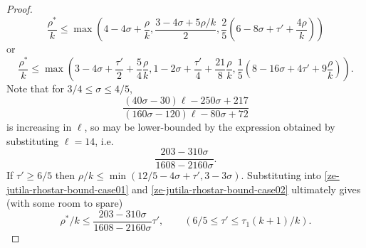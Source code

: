 \begin{proof}
\begin{equation}
\frac{\rho^*}{k} \le \max(4 - 4\sigma + \frac{\rho}{k}, \frac{3 - 4\sigma + 5\rho/k}{2}, \frac{2}{5}(6 - 8\sigma + \tau' + \frac{4\rho}{k}))
\end{equation}
or 
\begin{equation}\label{ze-jutila-rhostar-bound-case02}
\frac{\rho^*}{k} \le \max(3 - 4\sigma + \frac{\tau'}{2} + \frac{5}{4}\frac{\rho}{k}, 1 - 2\sigma + \frac{\tau'}{4} + \frac{21}{8}\frac{\rho}{k}, \frac{1}{5}(8 - 16\sigma + 4\tau' + 9\frac{\rho}{k})).
\end{equation}
Note that for $3/4 \le \sigma \le 4/5$,
\[
\frac{(40\sigma - 30)\ell - 250\sigma + 217}{(160\sigma - 120)\ell - 80\sigma + 72}
\]
is increasing in $\ell$, so may be lower-bounded by the expression obtained by substituting $\ell = 14$, i.e.
\[
\frac{203 - 310\sigma}{1608 - 2160\sigma}.
\]
If $\tau' \ge 6/5$ then $\rho/k \le \min(12/5 - 4\sigma + \tau', 3 - 3\sigma)$. Substituting into \eqref{ze-jutila-rhostar-bound-case01} and \eqref{ze-jutila-rhostar-bound-case02} ultimately gives (with some room to spare)
\[
\rho^*/k \le \frac{203 - 310\sigma}{1608 - 2160\sigma}\tau',\qquad (6/5 \le \tau' \le \tau_1(k + 1)/k).
\]
\end{proof}


